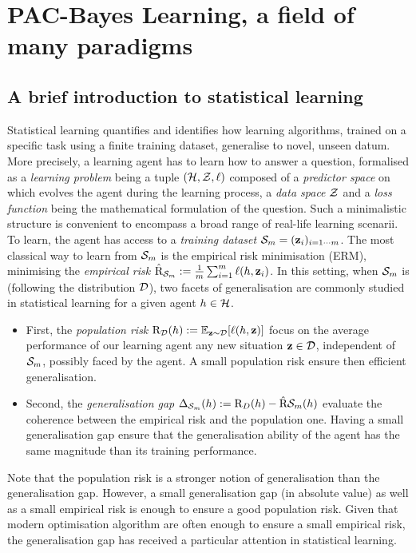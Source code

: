 \chapter[PAC-Bayes Learning, a field of many paradigms]{PAC-Bayes Learning, a field of many paradigms}
\label{chap:intro-pac-bayes}

\minitoc

\addchapterlof
\addchapterloa
\addchapterloe

\section{A brief introduction to statistical learning}

Statistical learning \citep{vapnik1999overview,james2013introduction} quantifies and identifies how learning algorithms, trained on a specific task using a finite training dataset, generalise to novel, unseen datum. More precisely, a learning agent has to learn how to answer a question, formalised as a \emph{learning problem} being a tuple $(\H,\Z,\ell)$ composed of a \emph{predictor space} on which evolves the agent during the learning process, a \emph{data space} $\Z$ and a \emph{loss function} being the mathematical formulation of the question. Such a minimalistic structure is convenient to encompass a broad range of real-life learning scenarii. To learn, the agent has access to a \emph{training dataset} $\S_m= (\z_i)_{i=1\cdots m}$. The most classical way to learn from $\Sm$ is the empirical risk minimisation (ERM), minimising the \emph{empirical risk} $\Riskhat_{\Sm}:= \frac{1}{m} \sum_{i=1}^m \ell(h,\z_i)$. In this setting, when $\S_m$ is \iid (following the distribution $\D$), two facets of generalisation are commonly studied in statistical learning for a given agent $h\in\H$.

\begin{itemize}
    \item First, the \emph{population risk} $\Risk_\D(h):= \mathbb{E}_{\z\sim\D}[\ell(h,\z)]$ focus on the average performance of our learning agent \wrt any new situation $\z\in\D$, independent of $\S_m$, possibly faced by the agent. A small population risk ensure then efficient generalisation.   
    \item Second, the \emph{generalisation gap}  $\Delta_{\Sm}(h):= \Risk_D(h) - \Riskhat{\Sm}(h)$ evaluate the coherence between the empirical risk and the population one. Having a small generalisation gap ensure that the generalisation ability of the agent has the same magnitude than its training performance. 
\end{itemize}
Note that the population risk is a stronger notion of generalisation than the generalisation gap. However, a small generalisation gap (in absolute value) as well as a small empirical risk is enough to ensure a good population risk. Given that modern optimisation algorithm are often enough to ensure a small empirical risk, the generalisation gap has received a particular attention in statistical learning. 

